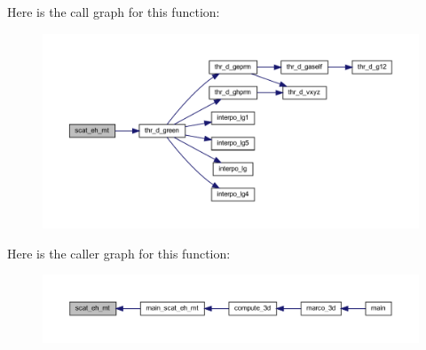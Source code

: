Here is the call graph for this function\+:
\nopagebreak
\begin{figure}[H]
\begin{center}
\leavevmode
\includegraphics[width=350pt]{Marco_8f90_a5fc5c17c4de06fc14e3e7da23d14dbc0_cgraph}
\end{center}
\end{figure}
Here is the caller graph for this function\+:
\nopagebreak
\begin{figure}[H]
\begin{center}
\leavevmode
\includegraphics[width=350pt]{Marco_8f90_a5fc5c17c4de06fc14e3e7da23d14dbc0_icgraph}
\end{center}
\end{figure}
\mbox{\label{Marco_8f90_a5b2af6ff73b05f7fda72228c32b99715}} 

